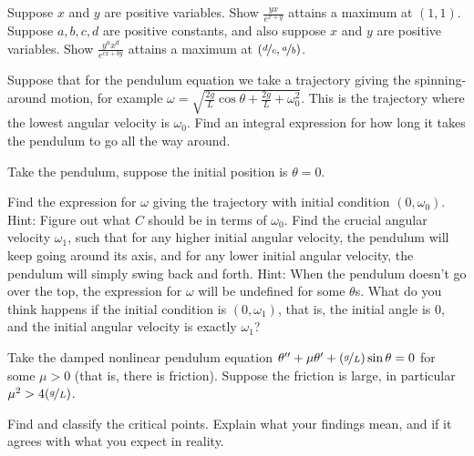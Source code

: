 \begin{exercise}
\leavevmode
\begin{tasks}
\task Suppose $x$ and $y$ are
positive variables.  Show $\frac{y x}{e^{x+y}}$
attains a maximum at $(1,1)$.
\task Suppose $a,b,c,d$ are positive constants, and also suppose $x$ and $y$ are
positive variables.  Show $\frac{y^a x^d}{e^{cx+by}}$
attains a maximum at $(\nicefrac{d}{c},\nicefrac{a}{b})$.
\end{tasks}
\end{exercise}

\begin{exercise}
Suppose that for the pendulum equation we take a trajectory giving the
spinning-around motion, for example $\omega = \sqrt{\frac{2g}{L} \cos \theta
+ \frac{2g}{L} + \omega_0^2}$.  This is the trajectory where the lowest
angular velocity is $\omega_0$.  Find an integral expression for how long it takes
the pendulum to go all the way around.
\end{exercise}

\begin{exercise}[challenging]
Take the pendulum, suppose the initial position is $\theta = 0$.
\begin{tasks}
\task
Find the expression for $\omega$ giving the trajectory
with initial condition $(0,\omega_0)$.  Hint: Figure out what $C$
should be in terms of $\omega_0$.
\task
Find the crucial angular velocity $\omega_1$, such that
for any higher initial angular velocity,
the pendulum will keep going around its
axis, and for any lower initial angular velocity, the pendulum will simply
swing back and forth.
Hint: When the pendulum doesn't go over the top, the expression for $\omega$
will be undefined for some $\theta$s.
\task
What do you think happens if the initial condition is $(0,\omega_1)$,
that is, the initial angle is 0, and the initial angular velocity is exactly
$\omega_1$?
\end{tasks}
\end{exercise}

\setcounter{exercise}{100}

\begin{exercise}
Take the damped nonlinear pendulum equation $\theta '' + \mu \theta' +
(\nicefrac{g}{L})
\sin \theta = 0$ for some $\mu > 0$ (that is, there is friction).
Suppose the friction is large, in particular $\mu^2 > 4 (\nicefrac{g}{L})$.
\begin{tasks}
\task
Find and classify the critical points.
\task
Explain what your findings mean, and if it agrees with what you
expect in reality.
\end{tasks}
\end{exercise}

